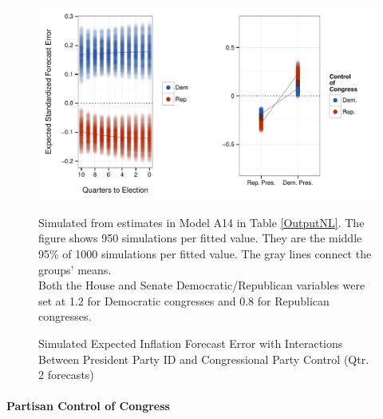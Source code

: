 \documentclass[a4paper]{article}\usepackage[]{graphicx}\usepackage[]{color}
\newenvironment{knitrout}{}{} %
\begin{document}
\begin{figure}[t]
    \caption{Simulated Expected Inflation Forecast Error with Interactions Between President Party ID and Congressional Party Control (Qtr. 2 forecasts)}
    \label{InterPlot}
    \begin{center}

\begin{knitrout}
\color{fgcolor}

{\centering \includegraphics[width=0.7\linewidth]{figure/InterPlot} 

}



\end{knitrout}


    \end{center}
    \begin{singlespace}
        {\scriptsize{Simulated from estimates in Model A14 in Table \ref{OutputNL}. The figure shows 950 simulations per fitted value. They are the middle 95\% of 1000 simulations per fitted value. The gray lines connect the groups' means.  \\ Both the House and Senate Democratic/Republican variables were set at 1.2 for Democratic congresses and 0.8 for Republican congresses.}}
    \end{singlespace}
\end{figure}

\paragraph{Partisan Control of Congress}
\end{document}
